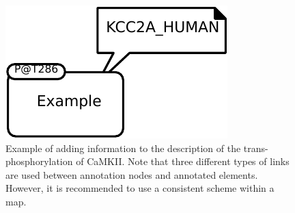 \begin{figure}[htb]
  \centering
  \includegraphics[scale = 0.8]{images/build/ex_annotation_example.pdf}
  \caption{Example of  adding information to the
    description of the trans-phosphorylation of CaMKII. Note that
    three different types of links are used between annotation nodes
    and annotated elements. However, it is recommended to use a
    consistent scheme within a map.}
  \label{fig:techref:ex-annotation}
\end{figure}
